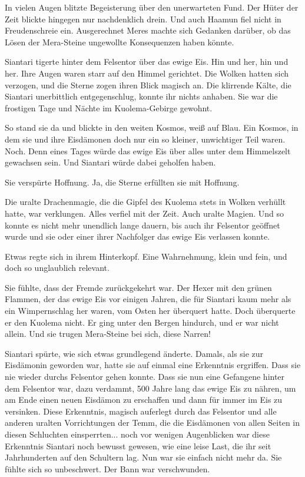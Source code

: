 In vielen Augen blitzte Begeisterung über den unerwarteten Fund. Der Hüter der Zeit blickte hingegen nur nachdenklich drein. Und auch Haamun fiel nicht in Freudenschreie ein. Ausgerechnet Meres machte sich Gedanken darüber, ob das Lösen der Mera-Steine ungewollte Konsequenzen haben könnte.



\trennzeichen



Siantari tigerte hinter dem Felsentor über das ewige Eis. Hin und her, hin und her. Ihre Augen waren starr auf den Himmel gerichtet. Die Wolken hatten sich verzogen, und die Sterne zogen ihren Blick magisch an. Die klirrende Kälte, die Siantari unerbittlich entgegenschlug, konnte ihr nichts anhaben. Sie war die frostigen Tage und Nächte im Kuolema-Gebirge gewohnt.

So stand sie da und blickte in den weiten Kosmos, weiß auf Blau. Ein Kosmos, in dem sie und ihre Eisdämonen doch nur ein so kleiner, unwichtiger Teil waren. Noch. Denn eines Tages würde das ewige Eis über alles unter dem Himmelszelt gewachsen sein. Und Siantari würde dabei geholfen haben.

Sie verspürte Hoffnung. Ja, die Sterne erfüllten sie mit Hoffnung.

Die uralte Drachenmagie, die die Gipfel des Kuolema stets in Wolken verhüllt hatte, war verklungen. Alles verfiel mit der Zeit. Auch uralte Magien. Und so konnte es nicht mehr unendlich lange dauern, bis auch ihr Felsentor geöffnet wurde und sie oder einer ihrer Nachfolger das ewige Eis verlassen konnte.

Etwas regte sich in ihrem Hinterkopf. Eine Wahrnehmung, klein und fein, und doch so unglaublich relevant.

Sie fühlte, dass der Fremde zurückgekehrt war. Der Hexer mit den grünen Flammen, der das ewige Eis vor einigen Jahren, die für Siantari kaum mehr als ein Wimpernschlag her waren, vom Osten her überquert hatte. Doch überquerte er den Kuolema nicht. Er ging unter den Bergen hindurch, und er war nicht allein. Und sie trugen Mera-Steine bei sich, diese Narren!

Siantari spürte, wie sich etwas grundlegend änderte. Damals, als sie zur Eisdämonin geworden war, hatte sie auf einmal eine Erkenntnis ergriffen. Dass sie nie wieder durchs Felsentor gehen konnte. Dass sie nun eine Gefangene hinter dem Felsentor war, dazu verdammt, 500 Jahre lang das ewige Eis zu nähren, um am Ende einen neuen Eisdämon zu erschaffen und dann für immer im Eis zu versinken. Diese Erkenntnis, magisch auferlegt durch das Felsentor und alle anderen uralten Vorrichtungen der Temm, die die Eisdämonen von allen Seiten in diesen Schluchten einsperrten... noch vor wenigen Augenblicken war diese Erkenntnis Siantari noch bewusst gewesen, wie eine leise Last, die ihr seit Jahrhunderten auf den Schultern lag. Nun war sie einfach nicht mehr da. Sie fühlte sich so unbeschwert. Der Bann war verschwunden.

